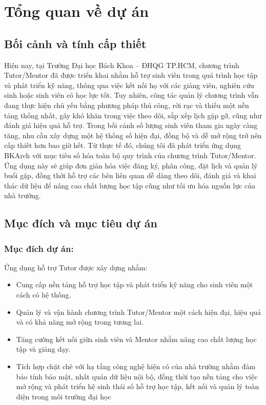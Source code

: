 \section{Tổng quan về dự án}
\subsection{Bối cảnh và tính cấp thiết}
Hiện nay, tại Trường Đại học Bách Khoa – ĐHQG TP.HCM, chương trình Tutor/Mentor đã được triển khai nhằm hỗ trợ sinh viên trong quá trình học tập và phát triển kỹ năng, thông qua việc kết nối họ với các giảng viên, nghiên cứu sinh hoặc sinh viên có học lực tốt. Tuy nhiên, công tác quản lý chương trình vẫn đang thực hiện chủ yếu bằng phương pháp thủ công, rời rạc và thiếu một nền tảng thống nhất, gây khó khăn trong việc theo dõi, sắp xếp lịch gặp gỡ, cũng như đánh giá hiệu quả hỗ trợ. Trong bối cảnh số lượng sinh viên tham gia ngày càng tăng, nhu cầu xây dựng một hệ thống số hiện đại, đồng bộ và dễ mở rộng trở nên cấp thiết hơn bao giờ hết. Từ thực tế đó, chúng tôi đã phát triển ứng dụng BKArch với mục tiêu số hóa toàn bộ quy trình của chương trình Tutor/Mentor. Ứng dụng này sẽ giúp đơn giản hóa việc đăng ký, phân công, đặt lịch và quản lý buổi gặp, đồng thời hỗ trợ các bên liên quan dễ dàng theo dõi, đánh giá và khai thác dữ liệu để nâng cao chất lượng học tập cũng như tối ưu hóa nguồn lực của nhà trường.

\subsection{Mục đích và mục tiêu dự án}
\subsubsection{Mục đích dự án:}
Ứng dụng hỗ trợ Tutor được xây dựng nhằm:
\begin{itemize}
    \item Cung cấp nền tảng hỗ trợ học tập và phát triển kỹ năng cho sinh viên một cách có hệ thống.
    \item Quản lý và vận hành chương trình Tutor/Mentor một cách hiện đại, hiệu quả và có khả năng mở rộng trong tương lai.
    \item Tăng cường kết nối giữa sinh viên và Mentor nhằm nâng cao chất lượng học tập và giảng dạy.
    \item Tích hợp chặt chẽ với hạ tầng công nghệ hiện có của nhà trường nhằm đảm bảo tính bảo mật, nhất quán dữ liệu nội bộ, đồng thời tạo nền tảng cho việc mở rộng và phát triển hệ sinh thái số hỗ trợ học tập, kết nối và quản lý toàn diện trong môi trường đại học
\end{itemize}

